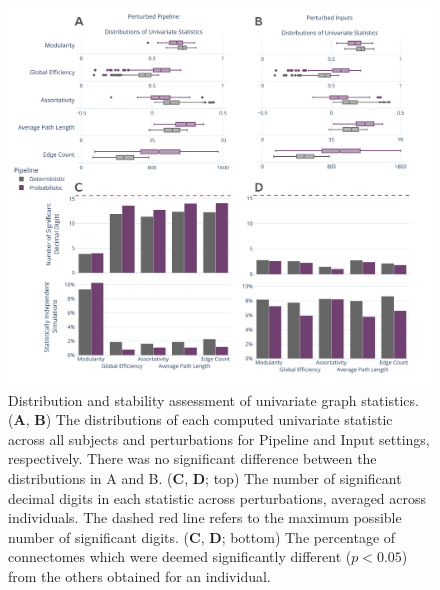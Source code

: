 \documentclass[fleqn,10pt]{SelfArx} %
\begin{document}
\begin{figure}[ht]\centering
\includegraphics[width=\linewidth]{figures/figS2_univariate_differences.pdf}
\caption{Distribution and stability assessment of univariate graph statistics. (\textbf{A}, \textbf{B}) The
distributions of each computed univariate statistic across all subjects and perturbations for Pipeline and Input
settings, respectively. There was no significant difference between the distributions in A and B. (\textbf{C},
\textbf{D}; top) The number of significant decimal digits in each statistic across perturbations, averaged across
individuals. The dashed red line refers to the maximum possible number of significant digits.
(\textbf{C}, \textbf{D}; bottom) The percentage of connectomes which were deemed significantly different
($p < 0.05$) from the others obtained for an individual.}
\label{sfig:univariate}
\end{figure}
\end{document}
